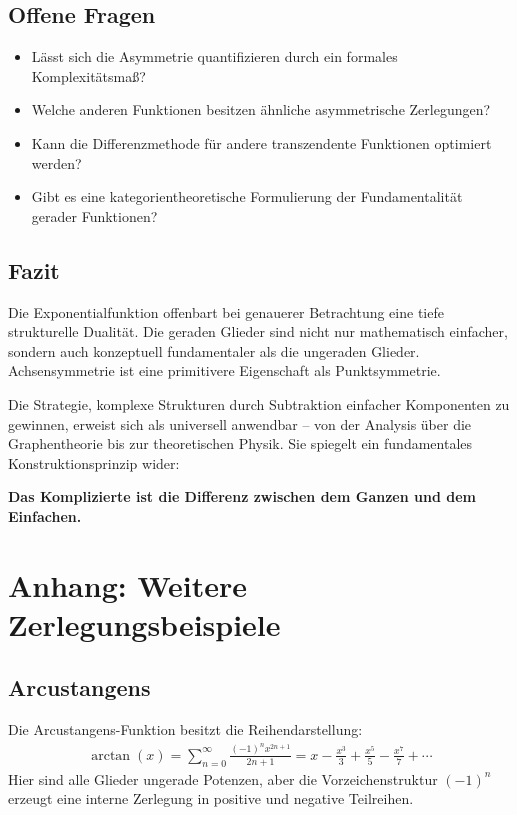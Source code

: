 ﻿\documentclass[a4paper,12pt]{article}
\theoremstyle{definition}
\begin{document}
\subsection{Offene Fragen}

\begin{itemize}
  \item[-] Lässt sich die Asymmetrie quantifizieren durch ein formales
           Komplexitätsmaß?
  \item[-] Welche anderen Funktionen besitzen ähnliche asymmetrische
           Zerlegungen?
  \item[-] Kann die Differenzmethode für andere transzendente Funktionen
           optimiert werden?
  \item[-] Gibt es eine kategorientheoretische Formulierung der
           Fundamentalität gerader Funktionen?
\end{itemize}

\subsection{Fazit}

Die Exponentialfunktion offenbart bei genauerer Betrachtung eine tiefe
strukturelle Dualität. Die geraden Glieder sind nicht nur mathematisch
einfacher, sondern auch konzeptuell fundamentaler als die ungeraden Glieder.
Achsensymmetrie ist eine primitivere Eigenschaft als Punktsymmetrie.

Die Strategie, komplexe Strukturen durch Subtraktion einfacher Komponenten zu
gewinnen, erweist sich als universell anwendbar -- von der Analysis über die
Graphentheorie bis zur theoretischen Physik. Sie spiegelt ein fundamentales
Konstruktionsprinzip wider:

\textbf{Das Komplizierte ist die Differenz zwischen dem Ganzen und dem
Einfachen.}

\section{Anhang: Weitere Zerlegungsbeispiele}

\subsection{Arcustangens}

Die Arcustangens-Funktion besitzt die Reihendarstellung:
\begin{align}
  \arctan(x) = \sum_{n=0}^{\infty} \frac{(-1)^n x^{2n+1}}{2n+1}
             = x - \frac{x^3}{3} + \frac{x^5}{5} - \frac{x^7}{7} + \cdots
\end{align}
Hier sind alle Glieder ungerade Potenzen, aber die Vorzeichenstruktur
$(-1)^n$ erzeugt eine interne Zerlegung in positive und negative Teilreihen.
\end{document}
